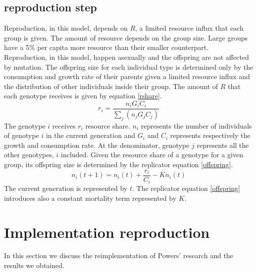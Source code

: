 \documentclass[runningheads]{llncs}
\begin{document}
\subsection{reproduction step}\label{repr}
Reproduction, in this model, depends on $R$, a limited resource influx
that each group is given. The amount of resource depends on the group
size. Large groups have a 5\% per capita more resource than their
smaller counterpart. Reproduction, in this model, happen asexually and
the offspring are not affected by mutation. The offspring size for
each individual type is determined only by the consumption and growth rate
of their parents given a limited resource influx and the distribution
of other individuals inside their group. The amount of $R$ that
each genotype receives is given by equation \ref{rshare}.
\begin{equation}\label{rshare}
r_i = \frac{n_i G_i C_i}{\sum_{j} (n_j G_j C_j)}
\end{equation}
The genotype $i$ receives $r_i$ resource share. $n_i$ represents the
number of individuals of genotype $i$ in the current generation and
$G_i$ and $C_i$ represents respectively the growth and consumption
rate. At the denominator, genotype $j$ represents all the other
genotypes, $i$ included. Given the resource share of a genotype for a
given group, its offspring size is determined by the replicator equation \ref{offspring}.
\begin{equation}\label{offspring}
n_i(t + 1) = n_i(t) + \frac {r_i}{C_i} - Kn_i(t)
\end{equation}
The current generation is represented by $t$. The replicator equation
\ref{offspring} introduces also a constant mortality term represented by $K$.

\section{Implementation reproduction}
In this section we discuss the reimplementation of Powers' research
\cite{groups} and the results we obtained.
\end{document}
